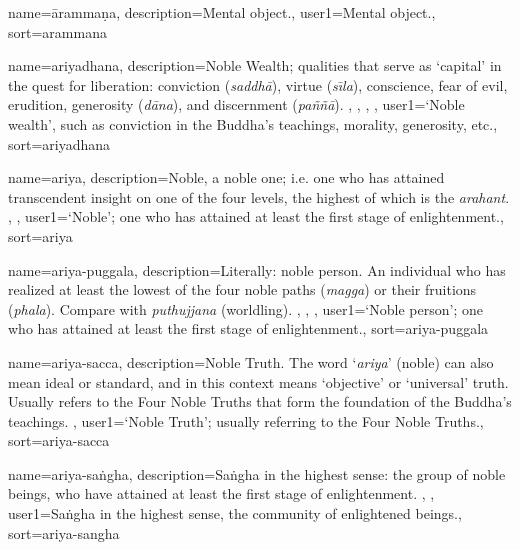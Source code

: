 {
name={\=aramma\d{n}a},
description={Mental object.},
user1={Mental object.},
sort={arammana}
}

{
name={ariyadhana},
description={Noble Wealth; qualities that serve as `capital' in the quest for liberation: conviction (\textit{saddh\=a}), virtue (\textit{s\={\i}la}), conscience, fear of evil, erudition, generosity (\textit{d\=ana}), and discernment (\textit{pa\~n\~n\=a}). \protect \seepre %
\protect {}, \protect {}, \protect {}, \protect {}%
\protect \seepost %
},
user1={`Noble wealth', such as conviction in the Buddha's teachings, morality, generosity, etc.},
sort={ariyadhana}
}

{
name=ariya,
description={Noble, a noble one; i.e. one who has attained transcendent insight on one of the four levels, the highest of which is the \textit{arahant}. \protect \seepre %
\protect {}, \protect {}%
\protect \seepost %
},
user1={`Noble'; one who has attained at least the first stage of enlightenment.},
sort={ariya}
}

{
name={ariya-puggala},
description={Literally: noble person. An individual who has realized at least the lowest of the four noble paths (\textit{magga}) or their fruitions (\textit{phala}). Compare with \textit{puthujjana} (worldling). \protect \seepre %
\protect {}, \protect {}, \protect {}%
\protect \seepost %
},
user1={`Noble person'; one who has attained at least the first stage of enlightenment.},
sort={ariya-puggala}
}

{
name={ariya-sacca},
description={Noble Truth. The word `\textit{ariya}' (noble) can also mean ideal or standard, and in this context means `objective' or `universal' truth. Usually refers to the Four Noble Truths that form the foundation of the Buddha's teachings. \protect \seepre %
\protect {}%
\protect \seepost %
},
user1={`Noble Truth'; usually referring to the Four Noble Truths.},
sort={ariya-sacca}
}

{
name=ariya-sa\.ngha,
description={Sa\.ngha in the highest sense: the group of noble beings, who have attained at least the first stage of enlightenment. \protect \seepre %
\protect {}, \protect {}%
\protect \seepost %
},
user1={Sa\.ngha in the highest sense, the community of enlightened beings.},
sort={ariya-sangha}
}

